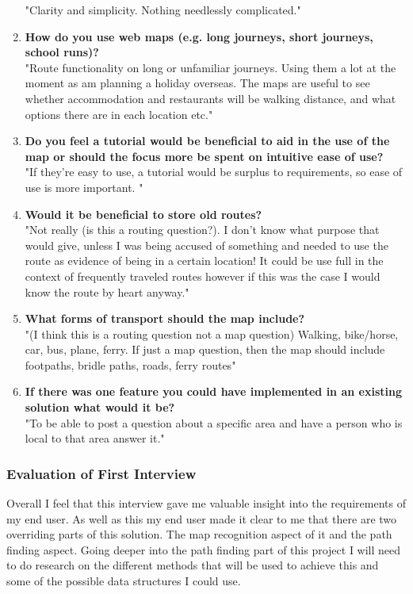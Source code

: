 \begin{flushleft}
\begin{enumerate}
                \bk 
                "Clarity and simplicity.  Nothing needlessly complicated."
                \item {\bf{How do you use web maps (e.g. long journeys, short journeys, school runs)?}} \\
                \bk
                "Route functionality on long or unfamiliar journeys. 
                Using them a lot at the moment as am planning a holiday overseas.  The maps are useful to see whether accommodation and restaurants will be walking distance, 
                and what options there are in each location etc."
                \item {\bf{Do you feel a tutorial would be beneficial to aid in the use of the map or should the focus more be spent on intuitive ease of use?}} \\
                \bk
                "If they're easy to use, a tutorial would be surplus to requirements, so ease of use is more important. "
                \item {\bf{Would it be beneficial to store old routes?}} \\
                \bk
                "Not really (is this a routing question?). I don't know what purpose that would give, unless I was being accused of something and needed to use the route as evidence of 
                being in a certain location! It could be use full in the context of frequently traveled routes however if this was the case I would know the route by heart anyway."
                \item {\bf{What forms of transport should the map include?}} \\
                \bk
                "(I think this is a routing question not a map question)
                Walking, bike/horse, car, bus, plane, ferry. 
                If just a map question, then the map should include footpaths, bridle paths, roads, ferry routes"
                \item {\bf{If there was one feature you could have implemented in an existing solution what would it be?}} \\
                \bk
                "To be able to post a question about a specific area and have a person who is local to that area answer it."
            \end{enumerate}
            
            \subsubsection{Evaluation of First Interview}
            Overall I feel that this interview gave me valuable insight into the requirements of my end user. As well as this my end user made it clear to me that there are two overriding 
            parts of this solution. The map recognition aspect of it and the path finding aspect. Going deeper into the path finding part of this project I will need to do research on the 
            different methods that will be used to achieve this and some of the possible data structures I could use. \\
        \bk


\end{flushleft}
